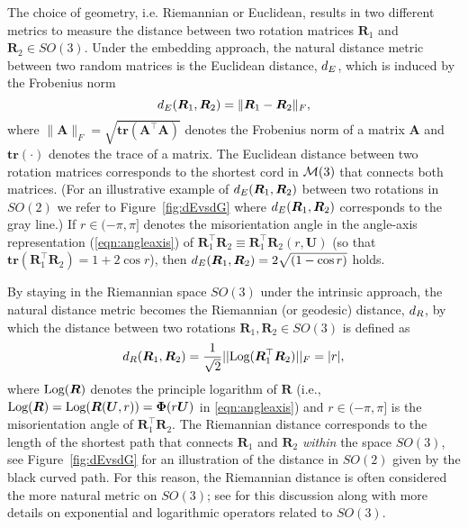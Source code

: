 The choice of geometry, i.e.\!\! Riemannian or Euclidean, results in two different metrics to measure the distance
between two rotation matrices $\bm{R}_1$ and $\bm{R}_2 \in SO(3)$. Under the embedding approach, the natural distance
metric between two random matrices is the Euclidean distance, ${d_E} $, which is induced by the Frobenius norm
\begin{equation}
\label{d_E}
{d_E} (\bm{R}_1,\bm{R}_2)=\|\bm{R}_1-\bm{R}_2\|_F, 
\end{equation}
where $\|\bm{A}\|_F = \sqrt{\mathbf{tr}({\bm A^\top \bm A})}$ denotes the Frobenius norm of a matrix $\bm A$ and $\mathbf{tr}(\cdot)$ denotes the trace of a matrix.  The Euclidean distance between two rotation matrices corresponds to the shortest cord in $\mathcal{M}(3)$  that connects both matrices. (For an illustrative example of ${d_E} (\bm{R}_1,\bm{R}_2)$ between two rotations in $SO(2)$ we refer to Figure~\ref{fig:dEvsdG} where ${d_E} (\bm{R}_1,\bm{R}_2)$ corresponds to the gray line.)  If $r\in(-\pi,\pi]$ denotes the misorientation angle in the angle-axis representation (\ref{eqn:angleaxis}) of $\bm{R}_1^\top \bm{R}_2 \equiv \bm{R}_1^\top \bm{R}_2(r,\bm{U})$ (so that $\mathbf{tr}(\bm{R}_1^\top \bm{R}_2) =1 +2 \cos r$), then ${d_E} (\bm{R}_1,\bm{R}_2) = 2\sqrt{(1-\cos r)}$ holds.

By staying in the Riemannian space $SO(3)$ under the intrinsic approach, the natural distance metric becomes the Riemannian (or geodesic) distance, ${d_R} $, by which the distance between two rotations $\bm{R}_1,\bm{R}_2\in SO(3)$  is  defined as
\begin{equation}
\label{d_R}
{d_R} (\bm{R}_1,\bm{R}_2)=  \frac{1}{\sqrt{2}}||
\text{Log}(\bm{R}_1^\top\bm{R}_2)||_F = |r|,
\end{equation}
where $\text{Log}(\bm{R})$ denotes the principle logarithm of $\bm{R}$ (i.e., $\text{Log}(\bm{R}) = \text{Log}(\bm{R}(\bm U,r))= \bm \Phi(r\bm U)$ in \eqref{eqn:angleaxis}) and $r\in(-\pi,\pi]$   is the misorientation angle of $\bm{R}_1^\top \bm{R}_2$.  The Riemannian distance corresponds to the length of the shortest path that connects $\bm{R}_1$ and $\bm{R}_2$ {\it within} the space $SO(3)$, see Figure~\ref{fig:dEvsdG} for an illustration of the distance in $SO(2)$ given by the black curved path. For this reason, the Riemannian distance is often considered the more natural metric on $SO(3)$; see \cite{moakher02} for this discussion along with more details on exponential and logarithmic operators related to $SO(3)$.    
 

